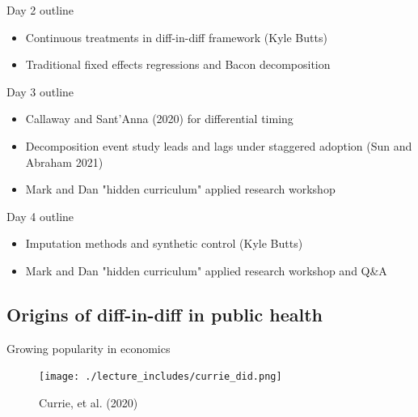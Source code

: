 \documentclass{beamer}
\begin{document}
\begin{frame}{Day 2 outline}

	\begin{itemize}
	\item Continuous treatments in diff-in-diff framework (Kyle Butts)
	\item Traditional fixed effects regressions and Bacon decomposition
	\end{itemize}

\end{frame}


\begin{frame}{Day 3 outline}


\begin{itemize}
\item Callaway and Sant'Anna (2020) for differential timing
\item Decomposition event study leads and lags under staggered adoption (Sun and Abraham 2021)
\item Mark and Dan "hidden curriculum" applied research workshop
\end{itemize}

\end{frame}

\begin{frame}{Day 4 outline}

\begin{itemize}

\item Imputation methods and synthetic control (Kyle Butts)
\item Mark and Dan "hidden curriculum" applied research workshop and Q\&A

\end{itemize}

\end{frame}



\subsection{Origins of diff-in-diff in public health}

\begin{frame}{Growing popularity in economics}

	\begin{figure}
	\caption{Currie, et al. (2020)}
	\texttt{[image: ./lecture\_includes/currie\_did.png]}
	\end{figure}

\end{frame}
\end{document}
